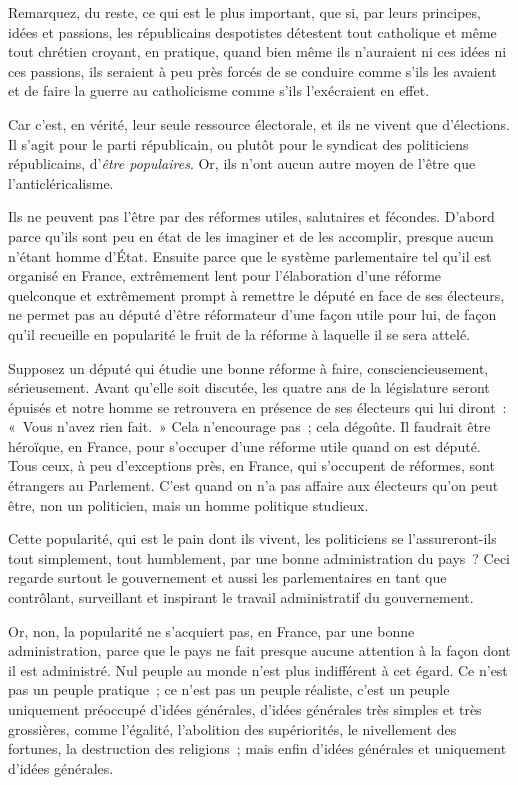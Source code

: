 \documentclass[french,twoside]{book} %
\begin{document}
\noindent Remarquez, du reste, ce qui est le plus important, que si, par leurs principes, idées et passions, les républicains despotistes détestent tout catholique et même tout chrétien croyant, en pratique, quand bien même ils n’auraient ni ces idées ni ces passions, ils seraient à peu près forcés de se conduire comme s’ils les avaient et de faire la guerre au catholicisme comme s’ils l’exécraient en effet.\par
Car c’est, en vérité, leur seule ressource électorale, et ils ne vivent que d’élections. Il s’agit pour le parti républicain, ou plutôt pour le syndicat des politiciens républicains, d’{\itshape être populaires}. Or, ils n’ont aucun autre moyen de l’être que l’anticléricalisme.\par
Ils ne peuvent pas l’être par des réformes utiles, salutaires et fécondes. D’abord parce qu’ils sont peu en état de les imaginer et de les accomplir, presque aucun n’étant homme d’État. Ensuite parce que le système parlementaire tel qu’il est organisé en France, extrêmement lent pour l’élaboration d’une réforme quelconque et extrêmement prompt à remettre le député en face de ses électeurs,  ne permet pas au député d’être réformateur d’une façon utile pour lui, de façon qu’il recueille en popularité le fruit de la réforme à laquelle il se sera attelé.\par
Supposez un député qui étudie une bonne réforme à faire, consciencieusement, sérieusement. Avant qu’elle soit discutée, les quatre ans de la législature seront épuisés et notre homme se retrouvera en présence de ses électeurs qui lui diront : « Vous n’avez rien fait. » Cela n’encourage pas ; cela dégoûte. Il faudrait être héroïque, en France, pour s’occuper d’une réforme utile quand on est député. Tous ceux, à peu d’exceptions près, en France, qui s’occupent de réformes, sont étrangers au Parlement. C’est quand on n’a pas affaire aux électeurs qu’on peut être, non un politicien, mais un homme politique studieux.\par
Cette popularité, qui est le pain dont ils vivent, les politiciens se l’assureront-ils tout simplement, tout humblement, par une bonne administration du pays ? Ceci regarde surtout le gouvernement et aussi les parlementaires en tant que contrôlant, surveillant et inspirant le travail administratif du gouvernement.\par
Or, non, la popularité ne s’acquiert pas, en France, par une bonne administration, parce que le pays ne fait presque aucune attention à la façon dont il est  administré. Nul peuple au monde n’est plus indifférent à cet égard. Ce n’est pas un peuple pratique ; ce n’est pas un peuple réaliste, c’est un peuple uniquement préoccupé d’idées générales, d’idées générales très simples et très grossières, comme l’égalité, l’abolition des supériorités, le nivellement des fortunes, la destruction des religions ; mais enfin d’idées générales et uniquement d’idées générales.\par
\end{document}
